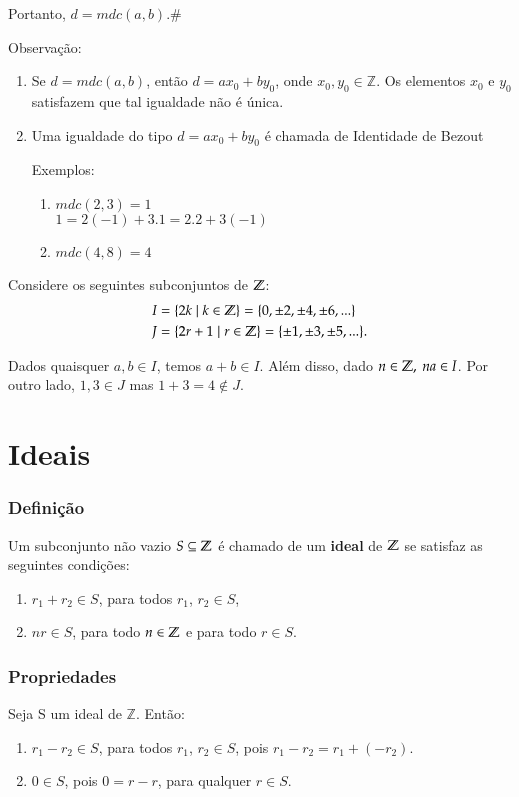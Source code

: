 Portanto, $d=mdc(a,b)$.\#

Observa{\c c}{\~a}o:
\begin{enumerate}
\item Se $d=mdc(a,b)$, ent{\~a}o $d=ax_{0}+by_{0}$, onde $x_{0},y_{0}\in\mathbb{Z}$. Os elementos $x_{0}$ e $y_{0}$ satisfazem que tal igualdade n{\~a}o {\'e} {\'u}nica.
\item Uma igualdade do tipo $d=ax_{0}+by_{0}$ {\'e} chamada de Identidade de Bezout

Exemplos:
\begin{enumerate}
\item $mdc(2,3)=1$\\
$1=2(-1)+3.1=2.2+3(-1)$
\item $mdc(4,8)=4$\\
\end{enumerate}
\end{enumerate}

Considere os seguintes subconjuntos de $\mathbb{Z}$:
\begin{align*}
	I &= \{2k \mid k\in\mathbb{Z}\} = \{0,\pm 2,\pm 4,\pm 6,...\}\\
	J &= \{2r+1\mid r\in\mathbb{Z}\} = \{\pm 1,\pm 3,\pm 5,...\}.
\end{align*}

Dados quaisquer $a,b\in I$, temos $a+b\in I$. Al{\'e}m disso, dado $n\in\mathbb{Z},\ na\in I$. Por outro lado, $1,3\in J$ mas $1+3=4\notin J$.

\section{Ideais}

\subsubsection{Defini{\c c}{\~a}o}
\begin{definicao}
Um subconjunto n{\~a}o vazio $S \subseteq\mathbb{Z}$ {\'e} chamado de um \textbf{ideal} de $\mathbb{Z}$ se satisfaz as seguintes condi{\c c}{\~o}es:
\begin{enumerate}
\item $r_1 + r_2\in S$, para todos $r_1$, $r_2\in S$,
\item $nr \in S$, para todo $n \in\mathbb{Z}$ e para todo $r \in S$.
\end{enumerate}
\end{definicao}

\subsubsection{Propriedades}
Seja S um ideal de $\mathbb{Z}$. Então:
\begin{enumerate}
\item $r_1 - r_2\in S$, para todos $r_1$, $r_2 \in S$, pois $r_1 - r_2 = r_1 + (-r_2)$.
\item $0 \in S$, pois $0 = r - r$, para qualquer $r\in S$.
\end{enumerate}

